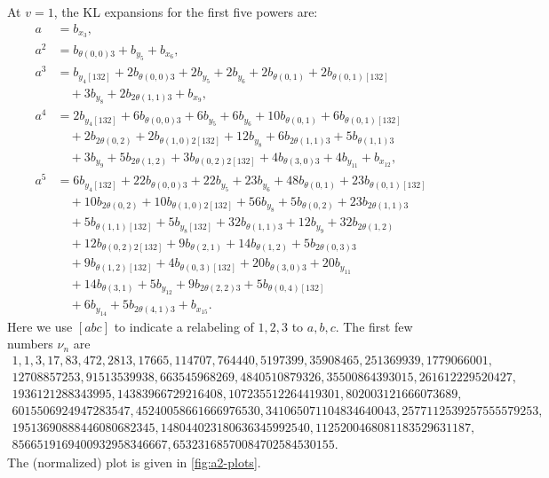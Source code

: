 \documentclass[a4paper,11pt]{amsart}
\numberwithin{equation}{subsection}
\theoremstyle{definition}
\theoremstyle{remark}
\begin{document}
At \(v=1\), the KL expansions for the first five powers are:
\begin{align*}
a
&=
b_{x_3},
\\[0.4em]
a^2
&=
b_{\theta(0,0)3}
+
b_{y_5}
+
b_{x_6},
\\[0.4em]
a^3
&=
b_{y_4[132]}
+
2b_{\theta(0,0)3}
+
2b_{y_5}
+
2b_{y_6}
+
2b_{\theta(0,1)}
+
2b_{\theta(0,1)[132]}
\\
&\quad
+
3b_{y_8}
+
2b_{2\theta(1,1)3}
+
b_{x_9},
\\[0.4em]
a^4
&=
2b_{y_4[132]}
+
6b_{\theta(0,0)3}
+
6b_{y_5}
+
6b_{y_6}
+
10b_{\theta(0,1)}
+
6b_{\theta(0,1)[132]}
\\
&\quad
+
2b_{2\theta(0,2)}
+
2b_{\theta(1,0)2[132]}
+
12b_{y_8}
+
6b_{2\theta(1,1)3}
+
5b_{\theta(1,1)3}
\\
&\quad
+
3b_{y_9}
+
5b_{2\theta(1,2)}
+
3b_{\theta(0,2)2[132]}
+
4b_{\theta(3,0)3}
+
4b_{y_{11}}
+
b_{x_{12}},
\\[0.4em]
a^5
&=
6b_{y_4[132]}
+
22b_{\theta(0,0)3}
+
22b_{y_5}
+
23b_{y_6}
+
48b_{\theta(0,1)}
+
23b_{\theta(0,1)[132]}
\\
&\quad
+
10b_{2\theta(0,2)}
+
10b_{\theta(1,0)2[132]}
+
56b_{y_8}
+
5b_{\theta(0,2)}
+
23b_{2\theta(1,1)3}
\\
&\quad
+
5b_{\theta(1,1)[132]}
+
5b_{y_8[132]}
+
32b_{\theta(1,1)3}
+
12b_{y_9}
+
32b_{2\theta(1,2)}
\\
&\quad
+
12b_{\theta(0,2)2[132]}
+
9b_{\theta(2,1)}
+
14b_{\theta(1,2)}
+
5b_{2\theta(0,3)3}
\\
&\quad
+
9b_{\theta(1,2)[132]}
+
4b_{\theta(0,3)[132]}
+
20b_{\theta(3,0)3}
+
20b_{y_{11}}
\\
&\quad
+
14b_{\theta(3,1)}
+
5b_{y_{12}}
+
9b_{2\theta(2,2)3}
+
5b_{\theta(0,4)[132]}
\\
&\quad
+
6b_{y_{14}}
+
5b_{2\theta(4,1)3}
+
b_{x_{15}}.
\end{align*}
Here we use $[abc]$ to indicate a relabeling of $1,2,3$ to $a,b,c$. The first few numbers $\nu_n$ are
\begin{gather*}
1, 1, 3, 17, 83, 472, 2813, 17665, 114707, 764440, 5197399, 35908465, 251369939, 1779066001,\\
12708857253, 91513539938, 663545968269, 4840510879326, 35500864393015, 261612229520427, \\ 1936121288343995, 14383966729216408, 107235512264419301, 802003121666073689, 
\\ 6015506924947283547, 45240058661666976530, 341065071104834640043, 2577112539257555579253,
\\ 19513690888446080682345, 148044023180636345992540, 1125200468081183529631187, \\
8566519169400932958346667, 65323168570084702584530155.
\end{gather*}
The (normalized) plot is given in \autoref{fig:a2-plots}.
\end{document}
